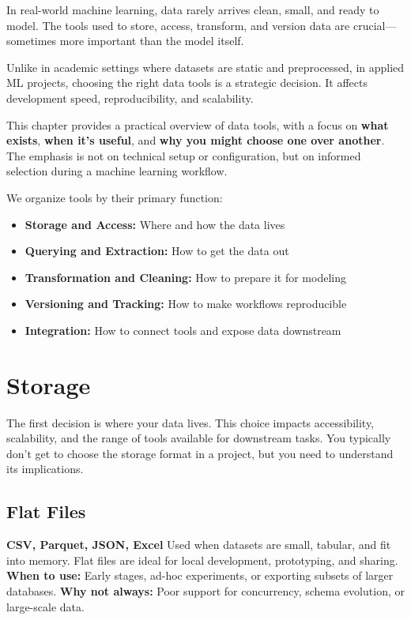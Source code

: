\documentclass[12pt,openany]{book}
\begin{document}
In real-world machine learning, data rarely arrives clean, small, and ready to model. The tools used to store, access, transform, and version data are crucial—sometimes more important than the model itself.

Unlike in academic settings where datasets are static and preprocessed, in applied ML projects, choosing the right data tools is a strategic decision. It affects development speed, reproducibility, and scalability. \newline

This chapter provides a practical overview of data tools, with a focus on \textbf{what exists}, \textbf{when it’s useful}, and \textbf{why you might choose one over another}. The emphasis is not on technical setup or configuration, but on informed selection during a machine learning workflow. \newline

We organize tools by their primary function:
\begin{itemize}
    \item \textbf{Storage and Access:} Where and how the data lives
    \item \textbf{Querying and Extraction:} How to get the data out
    \item \textbf{Transformation and Cleaning:} How to prepare it for modeling
    \item \textbf{Versioning and Tracking:} How to make workflows reproducible
    \item \textbf{Integration:} How to connect tools and expose data downstream
\end{itemize}



\section{Storage}

The first decision is where your data lives. This choice impacts accessibility, scalability, and the range of tools available for downstream tasks. You typically don’t get to choose the storage format in a project, but you need to understand its implications.

\subsection*{Flat Files}

\textbf{CSV, Parquet, JSON, Excel} \newline
Used when datasets are small, tabular, and fit into memory. Flat files are ideal for local development, prototyping, and sharing. \newline
\textbf{When to use:} Early stages, ad-hoc experiments, or exporting subsets of larger databases. \newline
\textbf{Why not always:} Poor support for concurrency, schema evolution, or large-scale data.
\end{document}
